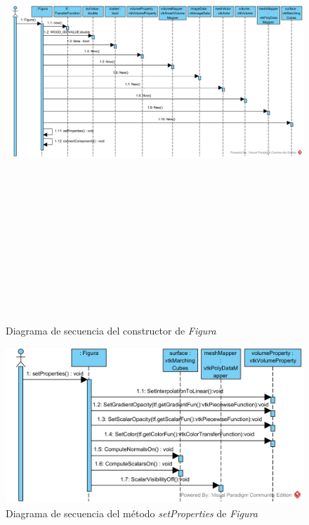 \begin{figure}[H]
	\centering
	\includegraphics[angle=90,height=18cm]{imagenes/diagramas/secuencia/Figura_New}
	\caption{Diagrama de secuencia del constructor de \textit{Figura}}
	\label{fig:diagrama_secuencia_figura_new}
\end{figure}

\begin{figure}[H]
	\centering
	\includegraphics[width=12cm]{imagenes/diagramas/secuencia/Figura_SetProperties}
	\caption{Diagrama de secuencia del método \textit{setProperties} de \textit{Figura}}
	\label{fig:diagrama_secuencia_figura_setproperties}
\end{figure}

